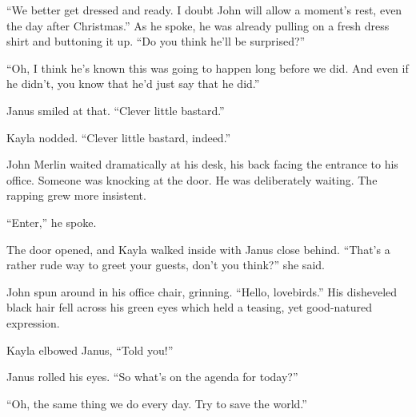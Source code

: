 “We better get dressed and ready. I doubt John will allow a moment’s rest, even the day after Christmas.” As he spoke, he was already pulling on a fresh dress shirt and buttoning it up. “Do you think he’ll be surprised?”

“Oh, I think he’s known this was going to happen long before we did. And even if he didn’t, you know that he’d just say that he did.”

Janus smiled at that. “Clever little bastard.”

Kayla nodded. “Clever little bastard, indeed.”
\simpleline


John Merlin waited dramatically at his desk, his back facing the entrance to his office. Someone was knocking at the door. He was deliberately waiting. The rapping grew more insistent.

“Enter,” he spoke.

The door opened, and Kayla walked inside with Janus close behind. “That’s a rather rude way to greet your guests, don’t you think?” she said.

John spun around in his office chair, grinning. “Hello, lovebirds.” His disheveled black hair fell across  his green eyes which held a teasing, yet good-natured expression.

Kayla elbowed Janus, “Told you!”

Janus rolled his eyes. “So what’s on the agenda for today?”

“Oh, the same thing we do every day. Try to save the world.”

